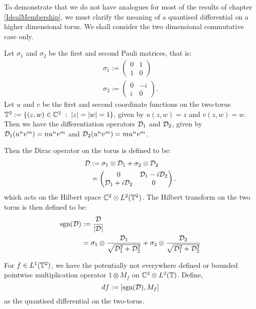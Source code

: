 To demonstrate that we do not have
analogues for most
of the results
of chapter \ref{IdealMembership}, we must clarify the meaning of a quantised differential
on a higher dimensional torus. We shall consider the two dimensional commutative case only.
\begin{definition}
\label{twoDirac}
    Let $\sigma_1$ and $\sigma_2$ be the first and second
    Pauli matrices, that is:
    \begin{align*}
        \sigma_1 := \begin{pmatrix}
            0 & 1\\
            1 & 0
        \end{pmatrix}\\
        \sigma_2 := \begin{pmatrix}
            0 & -i\\
            i & 0
        \end{pmatrix}.
    \end{align*}
    Let $u$ and $v$ be the first and second coordinate
    functions on the two-torus $\mathbb{T}^2 := \{(z,w) \in \mathbb{C}^2\;:\;|z| = |w| = 1\}$,
    given by $u(z,w) = z$ and $v(z,w) = w$. Then we have the differentiation
    operators $\mathcal{D}_1$ and $\mathcal{D}_2$, given by $\mathcal{D}_1(u^nv^m) = nu^nv^m$
    and $\mathcal{D}_2(u^nv^m) = mu^nv^m$.
    
    Then the Dirac operator on the torus is defined to be:
    \begin{align*}
        \mathcal{D} &:= \sigma_1 \otimes \mathcal{D}_1 + \sigma_2 \otimes \mathcal{D}_2\\
        &= \begin{pmatrix}
            0 & \mathcal{D}_1-i\mathcal{D}_2\\
            \mathcal{D}_1 + i\mathcal{D}_2 & 0
        \end{pmatrix}.
    \end{align*}
    which acts on the Hilbert space $\mathbb{C}^2 \otimes L^2(\mathbb{T}^2)$.
    The Hilbert transform on the two torus is then defined to be:
    \begin{align*}
        \operatorname{sgn}(\mathcal{D}) &:= \frac{\mathcal{D}}{|\mathcal{D}|}\\
        &= \sigma_1 \otimes \frac{\mathcal{D}_1}{\sqrt{\mathcal{D}_1^2+\mathcal{D}_2^2}} + \sigma_2 \otimes \frac{\mathcal{D}_2}{\sqrt{\mathcal{D}_1^2+\mathcal{D}_2^2}}
    \end{align*}
    
    For $f \in L^1(\mathbb{T}^2)$, we have the potentially not everywhere defined
    or bounded pointwise multiplication operator $1\otimes M_f$
    on $\mathbb{C}^2\otimes L^2(\mathbb{T})$. Define,
    \begin{equation}
        \qd f := [\sgn(\D),M_f]
    \end{equation}    
    as the quantised differential on the two-torus.
\end{definition}

